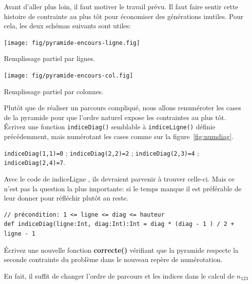\documentclass[10pt]{article}\usepackage[correction,nu]{esial}
\begin{document}
\begin{Reponse}
  Avant d'aller plus loin, il faut motiver le travail prévu. Il faut faire
  sentir cette histoire de contrainte au plus tôt pour économiser des
  générations inutiles. Pour cela, les deux schémas suivants sont utiles:
  
  \begin{minipage}{.4\linewidth}
    \centering
    \texttt{[image: fig/pyramide-encours-ligne.fig]}\vspace{-.5\baselineskip}
    
    Remplissage partiel par lignes.
  \end{minipage}\hfill
  \begin{minipage}{.4\linewidth} 
    \centering
    \texttt{[image: fig/pyramide-encours-col.fig]}\vspace{-.5\baselineskip}
    
    Remplissage partiel par colonnes.
  \end{minipage}
\end{Reponse}

\Question %
Plutôt que de réaliser un parcours compliqué, nous allons renuméroter les cases
de la pyramide pour que l'ordre naturel expose les contraintes au plus
tôt. Écrivez une fonction \texttt{indiceDiag()} semblable à
\texttt{indiceLigne()} définie précédemment, mais numérotant les cases comme sur
la figure~\ref{fig:numdiag}.
 
\noindent\texttt{indiceDiag(1,1)=0} ; \hfill\texttt{indiceDiag(2,2)=2} ;
\hfill\texttt{indiceDiag(2,3)=4} ; \hfill\texttt{indiceDiag(2,4)=7}.
\begin{Reponse}
  Avec le code de indiceLigne , ils devraient parvenir à trouver celle-ci. Mais
  ce n'est pas la question la plus importante: si le temps manque il est
  préférable de leur donner pour réfléchir plutôt au reste.
  \begin{Verbatim}
// précondition: 1 <= ligne <= diag <= hauteur 
def indiceDiag(ligne:Int, diag:Int):Int = diag * (diag - 1 ) / 2 + ligne - 1
  \end{Verbatim}
\end{Reponse}

\Question %
Écrivez une nouvelle fonction \textbf{correcte()} vérifiant que la pyramide
respecte la seconde contrainte du problème dans le nouveau repère de numérotation.

\begin{Reponse}
  En fait, il suffit de changer l'ordre de parcours et les indices dans le calcul de $n_{123}$
  
  \newcommand*\FancyVerbStartString{// BEGIN CORRECTE}
  \newcommand*\FancyVerbStopString{// END CORRECTE}
\end{Reponse}
\end{document}

